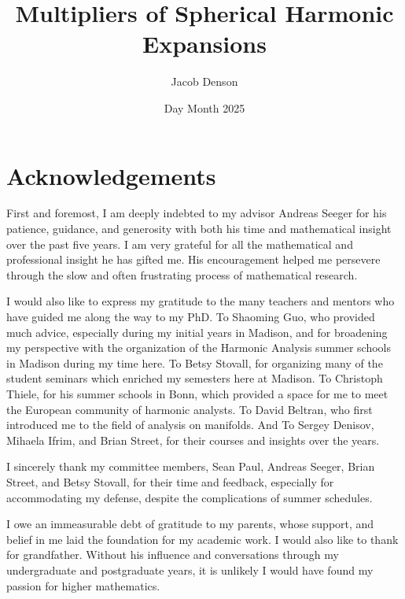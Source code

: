 \documentclass[12pt]{report}
\title{Multipliers of Spherical Harmonic Expansions}
\author{Jacob Denson}
\date{Day Month 2025}
\theoremstyle{plain}
\theoremstyle{remark}
\numberwithin{equation}{section}
\begin{document}









\chapter*{Acknowledgements}

\doublespacing
First and foremost, I am deeply indebted to my advisor Andreas Seeger for his patience, guidance, and generosity with both his time and mathematical insight over the past five years. I am very grateful for all the mathematical and professional insight he has gifted me. His encouragement helped me persevere through the slow and often frustrating process of mathematical research.

I would also like to express my gratitude to the many teachers and mentors who have guided me along the way to my PhD. To Shaoming Guo, who provided much advice, especially during my initial years in Madison, and for broadening my perspective with the organization of the Harmonic Analysis summer schools in Madison during my time here. To Betsy Stovall, for organizing many of the student seminars which enriched my semesters here at Madison. To Christoph Thiele, for his summer schools in Bonn, which provided a space for me to meet the European community of harmonic analysts. To David Beltran, who first introduced me to the field of analysis on manifolds. And To Sergey Denisov, Mihaela Ifrim, and Brian Street, for their courses and insights over the years.

I sincerely thank my committee members, Sean Paul, Andreas Seeger, Brian Street, and Betsy Stovall, for their time and feedback, especially for accommodating my defense, despite the complications of summer schedules.

I owe an immeasurable debt of gratitude to my parents, whose support, and belief in me laid the foundation for my academic work. I would also like to thank for grandfather. Without his influence and conversations through my undergraduate and postgraduate years, it is unlikely I would have found my passion for higher mathematics.
\end{document}
